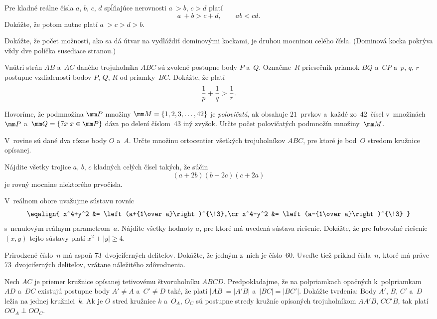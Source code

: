 ﻿{%
Pre kladné reálne čísla $a$, $b$, $c$, $d$ spĺňajúce nerovnosti $a~> b$, $c >d$ platí
$$
a~+ b > c + d, \qquad ab < cd.
$$
Dokážte, že potom nutne platí $a~> c > d > b$.
}

{%
Dokážte, že počet možností, ako sa dá útvar na \obr{} vydláždiť
dominovými kockami, je druhou mocninou celého čísla. (Dominová kocka
pokrýva vždy dve políčka susediace stranou.)
%
}

{%
Vnútri strán $AB$ a~$AC$ daného trojuholníka $ABC$
sú zvolené postupne body $P$ a~$Q$. Označme~$R$ priesečník priamok $BQ$ a~$CP$
a~$p$, $q$, $r$ postupne vzdialenosti bodov $P$, $Q$, $R$
od priamky~$BC$. Dokážte, že platí
$$
\belowdisplayskip 0pt
\frac{1}{p}+\frac{1}{q}>\frac{1}{r}.
$$
}

{%
Hovoríme, že podmnožina $\mm P$ množiny $\mm M=\{1,2,3,\dots,42\}$ je
{\it polovičatá}, ak obsahuje $21$~prvkov a~každé zo~42~čísel
v~množinách $\mm P$ a~$\mm Q=\{7 x\; x\in\mm P\}$ dáva po delení
číslom~43 iný zvyšok. Určte počet polovičatých podmnožín množiny~$\mm M$.}

{%
V~rovine sú dané dva rôzne body $O$ a~$A$. Určte množinu ortocentier
všetkých trojuholníkov $ABC$, pre ktoré je bod~$O$ stredom kružnice opísanej.}

{%
Nájdite všetky trojice $a$, $b$, $c$ kladných celých čísel
takých, že súčin
$$
(a+2b)(b+2c)(c+2a)
$$
je rovný mocnine niektorého prvočísla.}

{%
V~reálnom obore uvažujme sústavu rovníc
$$
\eqalign{
x^4+y^2 &= \left(a+{1\over a}\right)^{\!3},\cr
x^4-y^2 &= \left(a-{1\over a}\right)^{\!3}
}$$
s~nenulovým reálnym parametrom~$a$.
 Nájdite všetky hodnoty $a$, pre ktoré má uvedená sústava riešenie.
 Dokážte, že pre ľubovoľné riešenie $(x, y)$ tejto sústavy platí $x^2+|y|\ge 4$.
}

{%
Prirodzené číslo~$n$ má aspoň 73~dvojciferných deliteľov. Dokážte, že jedným
z~nich je číslo~60.
Uveďte tiež príklad čísla~$n$, ktoré má práve 73~dvojciferných deliteľov,
vrátane náležitého zdôvodnenia.}

{%
Nech $AC$ je priemer kružnice opísanej tetivovému štvoruholníku $ABCD$. Predpokladajme,
že na polpriamkach opačných
k~polpriamkam $AD$ a~$DC$ existujú postupne body $A'\ne A$ a~$C'\ne D$ také, že
platí $|AB|=|A'B|$ a~$|BC|=|BC'|$. Dokážte tvrdenia:
 Body $A'$, $B$, $C'$ a~$D$ ležia na jednej kružnici~$k$.
 Ak je $O$ stred kružnice $k$ a~$O_A$, $O_C$ sú postupne stredy
kružníc opísaných trojuholníkom $AA'B$, $CC'B$, tak platí $OO_A\perp OO_C$.\endgraf}

